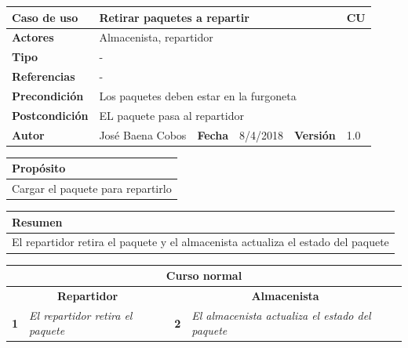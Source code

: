 \documentclass[12pt,spanish]{article}
\begin{document}
\begin{table}[H]
	\centering
	\begin{tabular}{|m{3cm}|m{4cm}|m{2cm}|m{2cm}|m{2cm}|m{1cm}|}
		\hline
		\textbf{Caso de uso} &  \multicolumn{4}{m{11cm}|}{Retirar paquetes a repartir} \vline &  \cellcolor{gray!40}CU\arabic{contadorCU}  \stepcounter{contadorCU} \\
		\hline
		\textbf{Actores} & \multicolumn{5}{m{11cm}|}{Almacenista, repartidor} \\
		\hline
		\textbf{Tipo} & \multicolumn{5}{m{11cm}|}{-} \\
		\hline
		\textbf{Referencias} &\multicolumn{5}{m{11cm}|}{-} \\
		\hline
		\textbf{Precondición} & \multicolumn{5}{m{11cm}|}{Los paquetes deben estar en la furgoneta} \\
		\hline
		\textbf{Postcondición} & \multicolumn{5}{m{11cm}|}{EL paquete pasa al repartidor} \\
		\hline
		\textbf{Autor} & José Baena Cobos & \textbf{Fecha} & 8/4/2018 & \textbf{Versión} & 1.0 \\
		\hline
	\end{tabular}
	
	\vspace{1cm}
	
	\begin{tabular}{|m{16.2cm}|}
		\hline
		\textbf{Propósito} \\
		\hline
		Cargar el paquete para repartirlo \\
		\hline
	\end{tabular}
	
	\vspace{1cm}
	
	\begin{tabular}{|m{16.2cm}|}
		\hline
		\textbf{Resumen} \\
		\hline
		El repartidor retira el paquete y el almacenista actualiza el estado del paquete \\
		\hline
	\end{tabular}
	
	\vspace{1cm}
	
	\begin{tabular}{|m{5pt}|m{7.33cm}|m{5pt}|m{7.33cm}|}
		\hline
		\multicolumn{4}{|c|}{\textbf{Curso normal}} \\
		\hline
		\multicolumn{2}{|c}{\textbf{Repartidor}} & \multicolumn{2}{|c|}{\textbf{Almacenista}} \\
		\hline
		\textbf{1} & \textit{El repartidor retira el paquete} & \textbf{2} & \textit{El almacenista actualiza el estado del paquete} \\
		\hline
		

\end{tabular}
\end{table}
\end{document}
